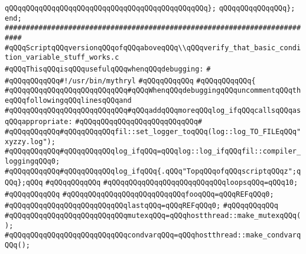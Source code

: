 \verb|qQQqqQQqqQQqqQQqqQQqqQQqqQQqqQQqqQQqqQQqqQQqqQQq};|\newline
\verb|qQQqqQQqqQQqqQQq};|\newline
\verb|end;|\newline
\newline
\newline
\verb|##########################################################################|\newline
\verb|#qQQqScriptqQQqversionqQQqofqQQqaboveqQQq\\qQQqverify_that_basic_condition_variable_stuff_works.c|\newline
\verb|#qQQqThisqQQqisqQQqusefulqQQqwhenqQQqdebugging:|\newline
\verb|#|\newline
\verb|#qQQqqQQqqQQq#!/usr/bin/mythryl|\newline
\verb|#qQQqqQQqqQQq|\newline
\verb|#qQQqqQQqqQQq{|\newline
\verb|#qQQqqQQqqQQqqQQqqQQqqQQqqQQq#qQQqWhenqQQqdebuggingqQQquncommentqQQqtheqQQqfollowingqQQqlinesqQQqand|\newline
\verb|#qQQqqQQqqQQqqQQqqQQqqQQqqQQq#qQQqaddqQQqmoreqQQqlog_ifqQQqcallsqQQqasqQQqappropriate:|\newline
\verb|#qQQqqQQqqQQqqQQqqQQqqQQqqQQq#|\newline
\verb|#qQQqqQQqqQQq#qQQqqQQqqQQqfil::set_logger_toqQQq(log::log_TO_FILEqQQq"xyzzy.log");|\newline
\verb|#qQQqqQQqqQQq#qQQqqQQqqQQqlog_ifqQQq=qQQqlog::log_ifqQQqfil::compiler_loggingqQQq0;|\newline
\verb|#qQQqqQQqqQQq#qQQqqQQqqQQqlog_ifqQQq{.qQQq"TopqQQqofqQQqscriptqQQqz";qQQq};qQQq|\newline
\verb|#qQQqqQQqqQQq|\newline
\verb|#qQQqqQQqqQQqqQQqqQQqqQQqqQQqloopsqQQq=qQQq10;|\newline
\verb|#qQQqqQQqqQQq|\newline
\verb|#qQQqqQQqqQQqqQQqqQQqqQQqqQQqfooqQQq=qQQqREFqQQq0;|\newline
\verb|#qQQqqQQqqQQqqQQqqQQqqQQqqQQqlastqQQq=qQQqREFqQQq0;|\newline
\verb|#qQQqqQQqqQQq|\newline
\verb|#qQQqqQQqqQQqqQQqqQQqqQQqqQQqmutexqQQq=qQQqhostthread::make_mutexqQQq();|\newline
\verb|#qQQqqQQqqQQqqQQqqQQqqQQqqQQqcondvarqQQq=qQQqhostthread::make_condvarqQQq();|\newline
